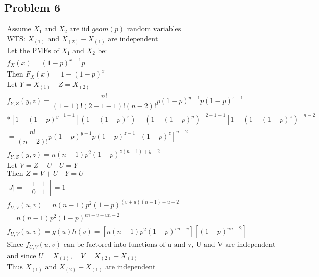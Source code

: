 \documentclass{article}
\begin{document}
\begin{flushleft}
\section*{Problem 6}
\begin{multline*}
\text{Assume } X_1 \text{ and } X_2 \text{ are iid } geom(p) \text{ random variables}\\
\text{WTS: } X_{(1)} \text{ and } X_{(2)}-X_{(1)} \text{ are independent}\\
\text{Let the PMFs of } X_1 \text{ and } X_2 \text{ be:}\\
f_X(x)=(1-p)^{x-1}p\\
\text{Then } F_X(x)=1-(1-p)^x\\
\text{Let } Y=X_{(1)} \quad Z=X_{(2)}\\
f_{Y,Z}(y,z)=\dfrac{n!}{(1-1)!(2-1-1)!(n-2)!}p(1-p)^{y-1}p(1-p)^{z-1}\\
*[1-(1-p)^y]^{1-1}[(1-(1-p)^z)-(1-(1-p)^y)]^{2-1-1}[1-(1-(1-p)^z)]^{n-2}\\
=\dfrac{n!}{(n-2)!}p(1-p)^{y-1}p(1-p)^{z-1}[(1-p)^z]^{n-2}\\
f_{Y,Z}(y,z)=n(n-1)p^2(1-p)^{z(n-1)+y-2}\\
\text{Let } V=Z-U \quad U=Y\\
\text{Then } Z=V+U \quad Y=U\\
|J|=\begin{bmatrix}
1&1\\
0&1
\end{bmatrix}=1\\
f_{U,V}(u,v)=n(n-1)p^2(1-p)^{(v+u)(n-1)+u-2}\\
=n(n-1)p^2(1-p)^{vn-v+un-2}\\
f_{U,V}(u,v)=g(u)h(v)=[n(n-1)p^2(1-p)^{vn-v}][(1-p)^{un-2}]\\
\text{Since } f_{U,V}(u,v) \text{ can be factored into functions of u and v, U and V are independent}\\
\text{and since } U=X_{(1)}, \quad  V=X_{(2)}-X_{(1)}\\
\text{Thus }  X_{(1)} \text{ and } X_{(2)}-X_{(1)} \text{ are independent}\\
\end{multline*}
\end{flushleft}
\end{document}
